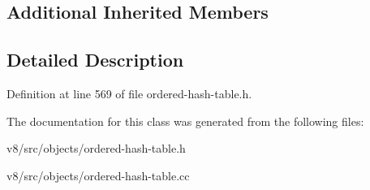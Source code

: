 \subsection*{Additional Inherited Members}


\subsection{Detailed Description}


Definition at line 569 of file ordered-\/hash-\/table.\+h.



The documentation for this class was generated from the following files\+:\begin{DoxyCompactItemize}
\item 
v8/src/objects/ordered-\/hash-\/table.\+h\item 
v8/src/objects/ordered-\/hash-\/table.\+cc\end{DoxyCompactItemize}
